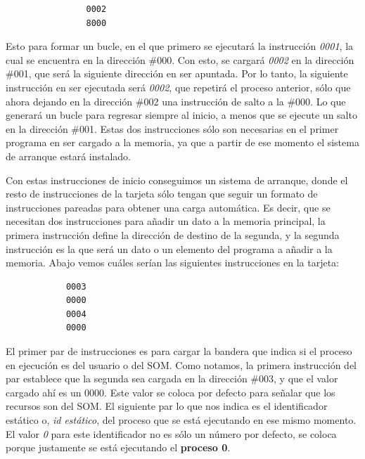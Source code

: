 \documentclass[letterpaper,12pt,oneside]{book}
\begin{document}
		\begin{center}
		\begin{minipage}{0\textwidth}
			\begin{verbatim}
				0002
				8000
			\end{verbatim}	
		\end{minipage}
		\end{center}
		
		Esto para formar un bucle, en el que primero se ejecutará la instrucción \textit{0001}, la cual se encuentra en la dirección \#000. Con esto, se
		cargará \textit{0002} en la dirección \#001, que será la siguiente dirección en ser apuntada. Por lo tanto, la siguiente
		instrucción en ser ejecutada será \textit{0002}, que repetirá el proceso anterior, sólo que ahora dejando en la dirección \#002
		 una instrucción de 
		salto a la \#000. Lo que generará un bucle para regresar siempre al inicio, a menos que se ejecute un salto en la 
		dirección
		\#001. Estas dos instrucciones sólo son necesarias en el primer programa en ser cargado a la memoria, ya que a partir de ese momento
		el sistema de arranque estará instalado.
		
		Con estas instrucciones de inicio conseguimos un sistema de arranque, donde el resto de instrucciones de la tarjeta sólo tengan que 
		seguir
		un formato de instrucciones pareadas para obtener una carga automática. Es decir, que se necesitan dos instrucciones para añadir un dato a la 
		memoria principal, la primera 
		instrucción define la dirección de destino
		de la segunda, y la segunda instrucción es la que será un dato o un elemento del programa a añadir a la memoria. Abajo vemos cuáles serían 
		las siguientes instrucciones en la tarjeta:
		
		\begin{center}
		\begin{minipage}{0\textwidth}
			\begin{verbatim}
			0003
			0000
			0004
			0000
			\end{verbatim}	
		\end{minipage}
		\end{center}
		
		El primer par de instrucciones es para cargar la bandera que indica si el proceso en ejecución es del usuario o del SOM.
		Como notamos, la primera instrucción del par establece que la segunda sea cargada en la dirección \#003, y que el valor cargado ahí es un 0000. 
		Este valor se coloca por defecto para señalar que los recursos son del SOM. El siguiente par lo que nos indica es el identificador estático o, \textit{id 
		estático}, del proceso
		que se está ejecutando en ese mismo momento. El valor \textit{0} para este identificador no es sólo un número por defecto, se coloca porque 
		justamente se está ejecutando el 
		\textbf{proceso 0}. 
  
\end{document}
